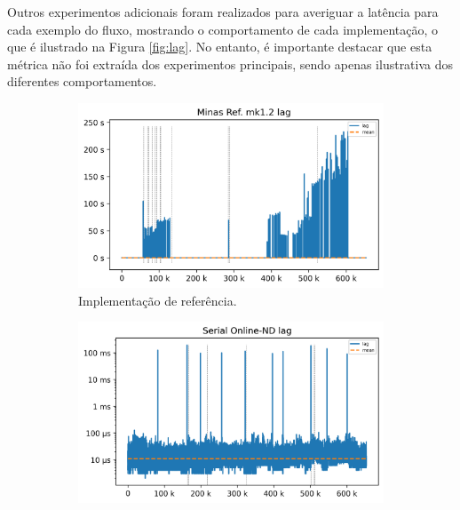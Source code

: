 Outros experimentos adicionais foram realizados para averiguar a latência para
cada exemplo do fluxo, mostrando o comportamento de cada implementação, o que é
ilustrado na Figura \ref{fig:lag}.
No entanto, é importante destacar que esta métrica não foi extraída dos
experimentos principais, sendo apenas ilustrativa dos diferentes comportamentos.


\begin{figure}[ht]
  \centering
  \begin{subfigure}{0.48\textwidth}
    \centering
    \includegraphics[width=1\linewidth]{experiments/lag-java.png}
    \caption{Implementação de referência.}
    \label{fig:lag-java}
  \end{subfigure}
  \hfill
  \begin{subfigure}{0.48\textwidth}
    \centering
    \includegraphics[width=1\linewidth]{experiments/lag-serial.png}

\end{subfigure}
\end{figure}

